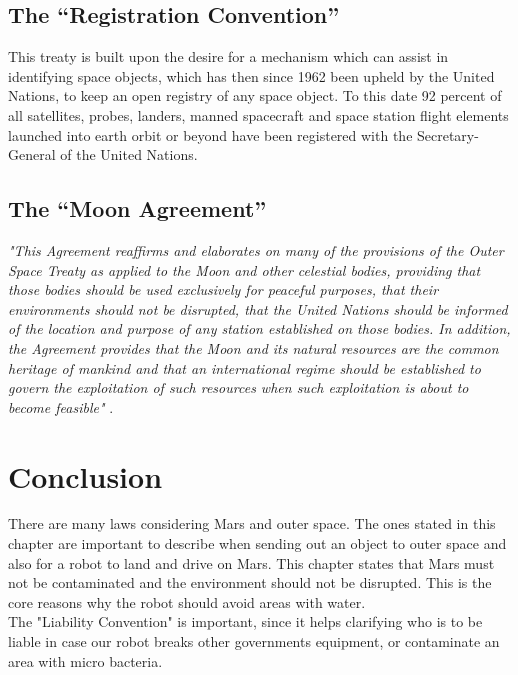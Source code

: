 \subsection{The “Registration Convention”}
This treaty is built upon the desire for a mechanism which can assist in identifying space objects, which has then since 1962 been upheld by the United Nations, to keep an open registry of any space object. 
To this date 92 percent of all satellites, probes, landers, manned spacecraft and space station flight elements launched into earth orbit or beyond have been registered with the Secretary-General of the United Nations\cite{Treaty4}. 

\subsection{The “Moon Agreement”} \label{ch:moonAgreement}
\textit{"This Agreement reaffirms and elaborates on many of the provisions of the Outer Space Treaty as applied to the Moon and other celestial bodies, providing that those bodies should be used exclusively for peaceful purposes, that their environments should not be disrupted, that the United Nations should be informed of the location and purpose of any station established on those bodies. In addition, the Agreement provides that the Moon and its natural resources are the common heritage of mankind and that an international regime should be established to govern the exploitation of such resources when such exploitation is about to become feasible"} \cite{Treaty5}.

\section{Conclusion}
There are many laws considering Mars and outer space. The ones stated in this chapter are important to describe when sending out an object to outer space and also for a robot to land and drive on Mars. This chapter states that Mars must not be contaminated and the environment should not be disrupted. This  is the core reasons why the robot should avoid areas with water.\\
The "Liability Convention" is important, since it helps clarifying who is to be liable in case our robot breaks other governments equipment, or contaminate an area with micro bacteria.
